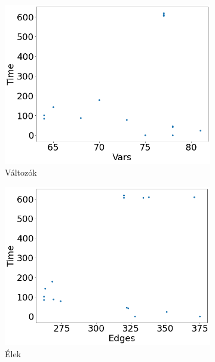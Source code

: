 \begin{figure}[ht] 
	\begin{subfigure}[b]{0.5\linewidth}
		\centering
		\includegraphics[width=0.95\linewidth]{figures/ssh/vars.png} 
		\caption{Változók} 
		\label{fig7:a} 
		\vspace{4ex}
	\end{subfigure}%
	\begin{subfigure}[b]{0.5\linewidth}
		\centering
		\includegraphics[width=0.95\linewidth]{figures/ssh/edges.png} 
		\caption{Élek} 
		\label{fig7:b} 
		\vspace{4ex}
	\end{subfigure} 
	\begin{subfigure}[b]{0.5\linewidth}
		\centering

\end{subfigure}
\end{figure}
